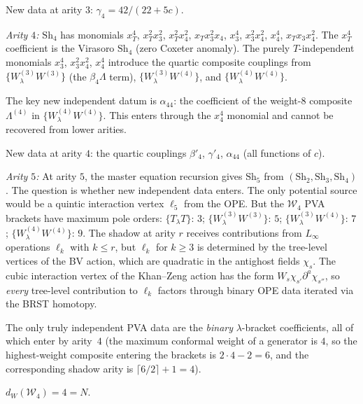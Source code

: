 \documentclass[11pt]{article}
\newcommand{\cW}{\mathcal{W}}
\begin{document}
New data at arity $3$: $\gamma_4 = 42/(22{+}5c)$.

\emph{Arity $4$:}
$\mathrm{Sh}_4$ has monomials
$x_T^4$, $x_T^2 x_3^2$, $x_T^2 x_4^2$, $x_T x_3^2 x_4$,
$x_3^4$, $x_3^2 x_4^2$, $x_4^4$, $x_T x_3 x_4^2$.
The $x_T^4$ coefficient is the Virasoro $\mathrm{Sh}_4$ (zero
Coxeter anomaly).  The purely $T$-independent monomials
$x_3^4$, $x_3^2 x_4^2$, $x_4^4$ introduce the quartic
composite couplings from $\{W^{(3)}_\lambda W^{(3)}\}$
(the $\beta_4\Lambda$ term), $\{W^{(3)}_\lambda W^{(4)}\}$,
and $\{W^{(4)}_\lambda W^{(4)}\}$.

The key new independent datum is $\alpha_{44}$: the coefficient
of the weight-$8$ composite $\Lambda^{(4)}$ in
$\{W^{(4)}_\lambda W^{(4)}\}$.  This enters through the $x_4^4$
monomial and cannot be recovered from lower arities.

New data at arity $4$: the quartic couplings
$\beta'_4$, $\gamma'_4$, $\alpha_{44}$ (all functions of $c$).

\emph{Arity $5$:}
At arity $5$, the master equation recursion gives
$\mathrm{Sh}_5$ from $(\mathrm{Sh}_2, \mathrm{Sh}_3,
\mathrm{Sh}_4)$.  The question is whether new independent
data enters.  The only potential source would be a quintic
interaction vertex $\ell_5$ from the OPE.  But the $\cW_4$
PVA brackets have maximum pole orders:
$\{T_\lambda T\}$: $3$;
$\{W^{(3)}_\lambda W^{(3)}\}$: $5$;
$\{W^{(3)}_\lambda W^{(4)}\}$: $7$;
$\{W^{(4)}_\lambda W^{(4)}\}$: $9$.
The shadow at arity $r$ receives contributions from
$L_\infty$ operations $\ell_k$ with $k \le r$, but $\ell_k$
for $k \ge 3$ is determined by the tree-level vertices of the
BV action, which are quadratic in the antighost fields $\chi_s$.
The cubic interaction vertex of the Khan--Zeng action has the
form $W_s \chi_{s'} \partial^a \chi_{s''}$, so \emph{every}
tree-level contribution to $\ell_k$ factors through binary
OPE data iterated via the BRST homotopy.

The only truly independent PVA data are the \emph{binary}
$\lambda$-bracket coefficients, all of which enter by arity~$4$
(the maximum conformal weight of a generator is $4$, so the
highest-weight composite entering the brackets is $2 \cdot 4 - 2
= 6$, and the corresponding shadow arity is
$\lceil 6/2 \rceil + 1 = 4$).

\begin{theorem}[$W$-essential depth of $\cW_4$]
\label{thm:w4-essential-depth}
$d_W(\cW_4) = 4 = N$.
\end{theorem}
\end{document}
